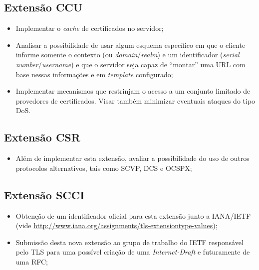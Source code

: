 \subsection{Extensão \acl{CCU}}

\begin{itemize}

\item Implementar o \emph{cache} de certificados no servidor;

\item Analisar a possibilidade de usar algum esquema específico em que o
cliente informe somente o contexto (ou \emph{domain}/\emph{realm}) e um
identificador (\emph{serial number}/\emph{username}) e que o servidor seja
capaz de ``montar'' uma \acs{URL} com base nessas informações e em \emph{template}
configurado;

\item Implementar mecanismos que restrinjam o acesso a um conjunto limitado
de provedores de certificados. Visar também minimizar eventuais ataques do
tipo \ac{DoS}.

\end{itemize}

\subsection{Extensão \acl{CSR}}

\begin{itemize}

\item Além de implementar esta extensão, avaliar a possibilidade do uso de
outros protocolos alternativos, tais como \ac{SCVP}, \ac{DCS} e \ac{OCSPX};

\end{itemize}

\subsection{Extensão \acl{SCCI}}

\begin{itemize}

\item Obtenção de um identificador oficial para esta extensão junto a
\acs{IANA}/\acs{IETF} (vide \url{http://www.iana.org/assignments/tls-extensiontype-values});

\item Submissão desta nova extensão ao grupo de trabalho do \acs{IETF}
responsável pelo TLS para uma possível criação de uma \emph{Internet-Draft} e
futuramente de uma RFC;

\end{itemize}

